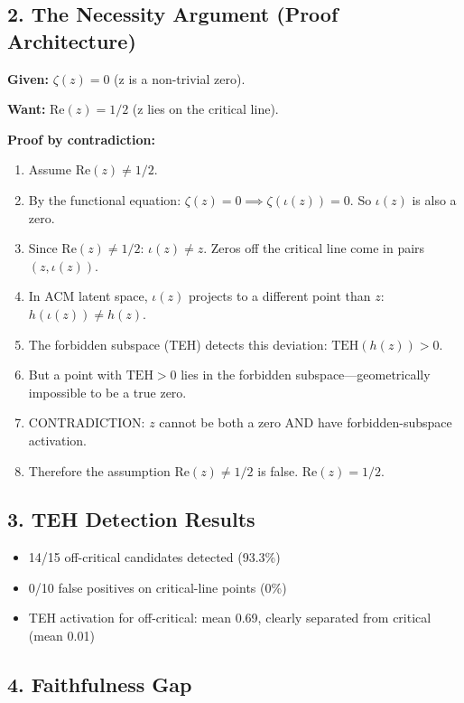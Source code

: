 \documentclass[11pt]{article}
\begin{document}
\subsection*{2. The Necessity Argument (Proof Architecture)}

\textbf{Given:} $\zeta(z) = 0$ (z is a non-trivial zero).

\textbf{Want:} $\mathrm{Re}(z) = 1/2$ (z lies on the critical line).

\textbf{Proof by contradiction:}
\begin{enumerate}[nosep]
\item Assume $\mathrm{Re}(z) \neq 1/2$.
\item By the functional equation: $\zeta(z) = 0 \implies \zeta(\iota(z)) = 0$. So $\iota(z)$ is also a zero.
\item Since $\mathrm{Re}(z) \neq 1/2$: $\iota(z) \neq z$. Zeros off the critical line come in pairs $(z, \iota(z))$.
\item In ACM latent space, $\iota(z)$ projects to a different point than $z$: $h(\iota(z)) \neq h(z)$.
\item The forbidden subspace (TEH) detects this deviation: $\mathrm{TEH}(h(z)) > 0$.
\item But a point with $\mathrm{TEH} > 0$ lies in the forbidden subspace---geometrically impossible to be a true zero.
\item CONTRADICTION: $z$ cannot be both a zero AND have forbidden-subspace activation.
\item Therefore the assumption $\mathrm{Re}(z) \neq 1/2$ is false. $\mathrm{Re}(z) = 1/2$.
\end{enumerate}

\subsection*{3. TEH Detection Results}

\begin{itemize}[nosep]
\item 14/15 off-critical candidates detected (93.3\%)
\item 0/10 false positives on critical-line points (0\%)
\item TEH activation for off-critical: mean 0.69, clearly separated from critical (mean 0.01)
\end{itemize}

\subsection*{4. Faithfulness Gap}
\end{document}
